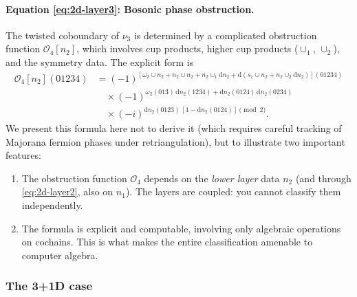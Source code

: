 \documentclass{SciPost}
\theoremstyle{definition}
\newcommand{\dd}{\mathrm{d}}
\begin{document}
\paragraph{Equation \eqref{eq:2d-layer3}: Bosonic phase obstruction.}
The twisted coboundary of $\nu_3$ is determined by a complicated obstruction function $\mathcal{O}_4[n_2]$, which involves cup products, higher cup products ($\cup_1$, $\cup_2$), and the symmetry data.
The explicit form is
\begin{align}
\mathcal{O}_4[n_2](01234) &= (-1)^{[\omega_2 \cup n_2 + n_2 \cup n_2 + n_2 \cup_1 \dd n_2 + \dd(s_1 \cup n_2 + n_2 \cup_2 \dd n_2)](01234)} \nonumber \\
&\quad \times (-1)^{\omega_2(013)\, \dd n_2(1234) + \dd n_2(0124)\, \dd n_2(0234)} \nonumber \\
&\quad \times (-i)^{\dd n_2(0123)\, [1 - \dd n_2(0124)] \pmod{2}}. \label{eq:O4-explicit}
\end{align}
We present this formula here not to derive it (which requires careful tracking of Majorana fermion phases under retriangulation), but to illustrate two important features:
\begin{enumerate}[label=(\roman*)]
    \item The obstruction function $\mathcal{O}_4$ depends on the \emph{lower layer} data $n_2$ (and through \eqref{eq:2d-layer2}, also on $n_1$).
    The layers are coupled: you cannot classify them independently.
    \item The formula is explicit and computable, involving only algebraic operations on cochains.
    This is what makes the entire classification amenable to computer algebra.
\end{enumerate}

\subsubsection{The 3+1D case}
\label{subsubsec:3d-case}
\end{document}
